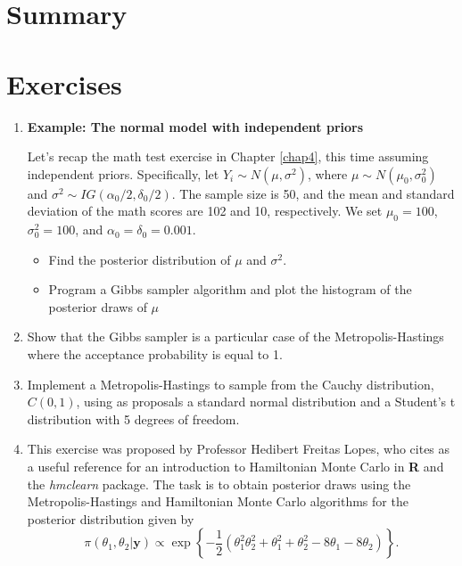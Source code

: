 \section{Summary}\label{sec56}


\section{Exercises}\label{sec57}

\begin{enumerate}
	\item \textbf{Example: The normal model with independent priors}
	
	Let's recap the math test exercise in Chapter \ref{chap4}, this time assuming independent priors. Specifically, let $Y_i \sim N(\mu, \sigma^2)$, where $\mu \sim N(\mu_0, \sigma_0^2)$ and $\sigma^2 \sim IG(\alpha_0 / 2, \delta_0 / 2)$. The sample size is 50, and the mean and standard deviation of the math scores are 102 and 10, respectively. We set $\mu_0 = 100$, $\sigma_0^2 = 100$, and $\alpha_0 = \delta_0 = 0.001$.
	
	\begin{itemize}
		\item Find the posterior distribution of $\mu$ and $\sigma^2$.
		\item Program a Gibbs sampler algorithm and plot the histogram of the posterior draws of $\mu$
	\end{itemize}

	\item Show that the Gibbs sampler is a particular case of the Metropolis-Hastings where the acceptance probability is equal to 1.
	
	\item Implement a Metropolis-Hastings to sample from the Cauchy distribution, $C(0,1)$, using as proposals a standard normal distribution and a Student's t distribution with 5 degrees of freedom.
	
	\item This exercise was proposed by Professor Hedibert Freitas Lopes, who cites \cite{thomas2021learning} as a useful reference for an introduction to Hamiltonian Monte Carlo in \textbf{R} and the \textit{hmclearn} package. The task is to obtain posterior draws using the Metropolis-Hastings and Hamiltonian Monte Carlo algorithms for the posterior distribution given by 
	\[
	\pi(\theta_1,\theta_2|\bm{y}) \propto \exp\left\{-\frac{1}{2}(\theta_1^2\theta_2^2 + \theta_1^2 + \theta_2^2 - 8\theta_1 - 8\theta_2)\right\}.
	\]
	

\end{enumerate}
